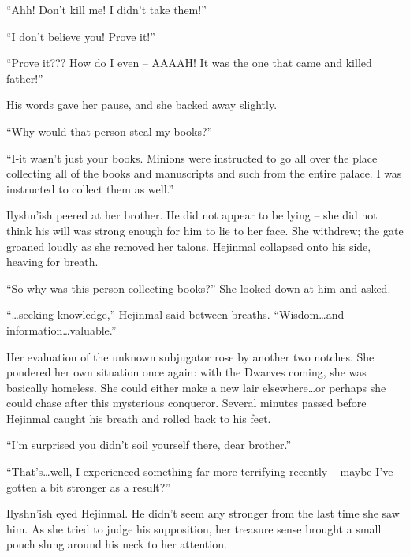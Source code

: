  

“Ahh! Don’t kill me! I didn’t take them!”

 

“I don’t believe you! Prove it!”

 

“Prove it??? How do I even – AAAAH! It was the one that came and killed father!”

 

His words gave her pause, and she backed away slightly.

 

“Why would that person steal my books?”

 

“I-it wasn’t just your books. Minions were instructed to go all over the place collecting all of the books and manuscripts and such from the entire palace. I was instructed to collect them as well.”

 

Ilyshn’ish peered at her brother. He did not appear to be lying – she did not think his will was strong enough for him to lie to her face. She withdrew; the gate groaned loudly as she removed her talons. Hejinmal collapsed onto his side, heaving for breath.

 

“So why was this person collecting books?” She looked down at him and asked.

 

“…seeking knowledge,” Hejinmal said between breaths. “Wisdom…and information…valuable.”

 

Her evaluation of the unknown subjugator rose by another two notches. She pondered her own situation once again: with the Dwarves coming, she was basically homeless. She could either make a new lair elsewhere…or perhaps she could chase after this mysterious conqueror. Several minutes passed before Hejinmal caught his breath and rolled back to his feet.

 

“I’m surprised you didn’t soil yourself there, dear brother.”

 

“That’s…well, I experienced something far more terrifying recently – maybe I’ve gotten a bit stronger as a result?”

 

Ilyshn’ish eyed Hejinmal. He didn’t seem any stronger from the last time she saw him. As she tried to judge his supposition, her treasure sense brought a small pouch slung around his neck to her attention.

